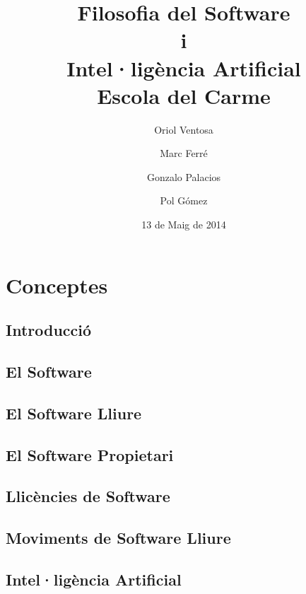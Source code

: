 \documentclass[a4paper,12pt]{report}
\begin{document}


\title{
	{\bf Filosofia del Software\\ i \\Intel·ligència Artificial} \\
	{\large Escola del Carme}
}
\author{
	Oriol Ventosa \and
	Marc Ferré \and
	Gonzalo Palacios \and
	Pol Gómez
}
\date{13 de Maig de 2014}

\maketitle

\tableofcontents

\part{Conceptes}

\chapter{Introducció}


\chapter{El Software}


\chapter{El Software Lliure}


\chapter{El Software Propietari}


\chapter{Llicències de Software}


\chapter{Moviments de Software Lliure}


\chapter{Intel·ligència Artificial}

\end{document}
